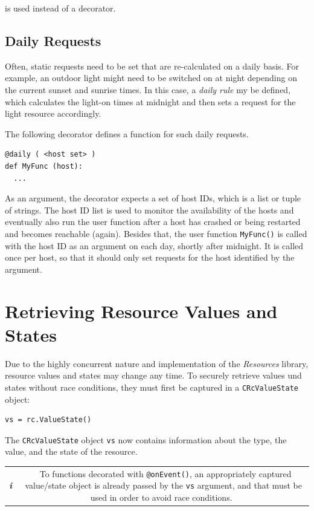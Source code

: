 \documentclass[12pt,english,parskip=half]{scrreprt}
\newcommand{\infobox}[1]{
  \hfill
  \setlength\arrayrulewidth{1pt}
  \begin{tabular}[t]{c|c|}
    \parbox{1.8em}{\hfill\textit{\Huge\textbf{i}\,}}
    &
    \,\parbox{0.89\linewidth}{\setlength{\parskip}{0.5em}#1}\,
  \end{tabular}
  \par
}
\begin{document}
is used instead of a decorator.



\subsection{Daily Requests}

Often, static requests need to be set that are re-calculated on a daily basis. 
For example, an outdoor light might need to be switched on at night depending on the current
sunset and sunrise times. In this case, a \emph{daily rule} my be defined, which 
calculates the light-on times at midnight and then sets a request for the light resource
accordingly.

The following decorator defines a function for such daily requests.

\begin{lstlisting}
@daily ( <host set> )
def MyFunc (host):
  ...
\end{lstlisting}

As an argument, the decorator expects a set of host IDs, which is a list or tuple of
strings. The host ID list is used to monitor the availability of the hosts and
eventually also run the user function after a host has crashed or being restarted
and becomes reachable (again). 
Besides that, the user function \texttt{MyFunc()} is called with the host ID as an argument on each day, shortly after midnight. It is called once per host, so that it should only 
set requests for the host identified by the argument.



\section{Retrieving Resource Values and States}
\label{sec:rules-values}

Due to the highly concurrent nature and implementation of the
\emph{Resources} library, resource values and states may change any
time. To securely retrieve values und states without race conditions,
they must first be captured in a \texttt{CRcValueState} object:

\begin{lstlisting}
vs = rc.ValueState()
\end{lstlisting}

The \texttt{CRcValueState} object \texttt{vs} now contains
information about the type, the value, and the state of the resource.

\infobox{
  To functions decorated with \texttt{@onEvent()}, an appropriately captured value/state
  object is already passed by the \texttt{vs} argument, and that must be used in order
  to avoid race conditions.
}
\end{document}
